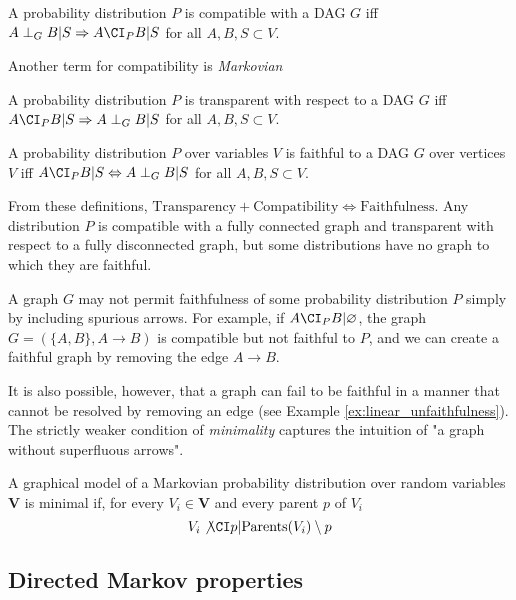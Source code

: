 \begin{definition}[Compatibility]\label{def:compatibility}
A probability distribution $P$ is compatible with a DAG $G$ iff $A\perp_G B |S \Rightarrow A\CI_P B | S$ for all $A, B, S \subset V$.

Another term for compatibility is \emph{Markovian}
\end{definition}

\begin{definition}[Transparency]
A probability distribution $P$ is transparent with respect to a DAG $G$ iff $A\CI_P B|S \Rightarrow A\perp_G B|S$ for all $A,B,S\subset V$.
\end{definition}

\begin{definition}[Faithfulness]\label{def:faithfulness}
A probability distribution $P$ over variables $V$ is faithful to a DAG $G$ over vertices $V$ iff $A \CI_P B | S \Leftrightarrow A\perp_G B | S$ for all $A,B,S\subset V$.
\end{definition}

From these definitions, $\text{Transparency}+\text{Compatibility}\Leftrightarrow \text{Faithfulness}$. Any distribution $P$ is compatible with a fully connected graph and transparent with respect to a fully disconnected graph, but some distributions have no graph to which they are faithful.

A graph $G$ may not permit faithfulness of some probability distribution $P$ simply by including spurious arrows. For example, if $A\CI_P B | \varnothing$, the graph $G=(\{A,B\},A\to B)$ is compatible but not faithful to $P$, and we can create a faithful graph by removing the edge $A\to B$.

It is also possible, however, that a graph can fail to be faithful in a manner that cannot be resolved by removing an edge (see Example \ref{ex:linear_unfaithfulness}). The strictly weaker condition of \emph{minimality} captures the intuition of "a graph without superfluous arrows".

\begin{definition}[Minimality]\label{def:minimality}
A graphical model of a Markovian probability distribution over random variables $\mathbf{V}$ is minimal if, for every $V_i\in\mathbf{V}$ and every parent $p$ of $V_i$
\[V_i\not\CI p|\mathrm{Parents}(V_i)\setminus p\]
\end{definition}


\subsection{Directed Markov properties}

